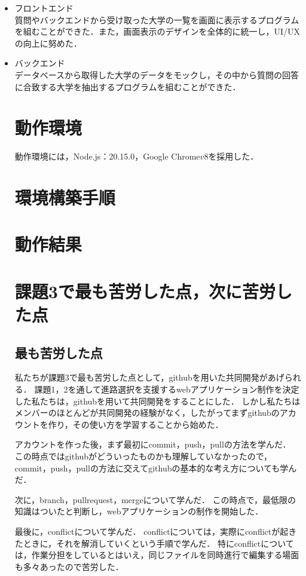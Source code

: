 \documentclass[a4j, titlepage]{jarticle}
\begin{document}
\begin{itemize}
\item{フロントエンド} \\
質問やバックエンドから受け取った大学の一覧を画面に表示するプログラムを組むことができた．また，画面表示のデザインを全体的に統一し，UI/UXの向上に努めた．
\item{バックエンド} \\
データベースから取得した大学のデータをモックし，その中から質問の回答に合致する大学を抽出するプログラムを組むことができた．

\section{動作環境}
動作環境には，Node.js：20.15.0，Google Chrome\(v8\)を採用した．
\section{環境構築手順}

\section{動作結果}

\section{課題3で最も苦労した点，次に苦労した点}
\subsection{最も苦労した点}

私たちが課題3で最も苦労した点として，githubを用いた共同開発があげられる．
課題1，2を通して進路選択を支援するwebアプリケーション制作を決定した私たちは，githubを用いて共同開発をすることにした．
しかし私たちはメンバーのほとんどが共同開発の経験がなく，したがってまずgithubのアカウントを作り，その使い方を学習することから始めた．

アカウントを作った後，まず最初にcommit，push，pullの方法を学んだ．
この時点ではgithubがどういったものかも理解していなかったので，commit，push，pullの方法に交えてgithubの基本的な考え方についても学んだ．

次に，branch，pullrequest，mergeについて学んだ．
この時点で，最低限の知識はついたと判断し，webアプリケーションの制作を開始した．

最後に，conflictについて学んだ．
conflictについては，実際にconflictが起きたときに，それを解消していくという手順で学んだ．
特にconflictについては，作業分担をしているとはいえ，同じファイルを同時進行で編集する場面も多々あったので苦労した．


\end{itemize}
\end{document}
